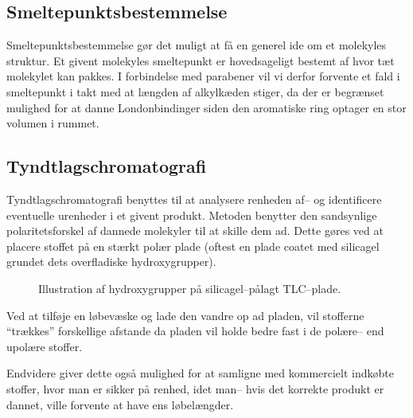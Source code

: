     \subsection{Smeltepunktsbestemmelse}
    Smeltepunktsbestemmelse gør det muligt at få en generel ide om et molekyles struktur. Et givent molekyles smeltepunkt er hovedsageligt bestemt af hvor tæt molekylet kan pakkes. I forbindelse med parabener vil vi derfor forvente et fald i smeltepunkt i takt med at længden af alkylkæden stiger, da der er begrænset mulighed for at danne Londonbindinger siden den aromatiske ring optager en stor volumen i rummet.

    \subsection{Tyndtlagschromatografi}
    Tyndtlagschromatografi benyttes til at analysere renheden af-- og identificere eventuelle urenheder i et givent produkt. Metoden benytter den sandsynlige polaritetsforskel af dannede molekyler til at skille dem ad. Dette gøres ved at placere stoffet på en stærkt polær plade (oftest en plade coatet med silicagel grundet dets overfladiske hydroxygrupper). 
    \begin{figure}[H]
        \caption{Illustration af hydroxygrupper på silicagel--pålagt TLC--plade.}
    \end{figure}
    Ved at tilføje en løbevæske og lade den vandre op ad pladen, vil stofferne ``trækkes'' forskellige afstande da pladen vil holde bedre fast i de polære-- end upolære stoffer.

    Endvidere giver dette også mulighed for at samligne med kommercielt indkøbte stoffer, hvor man er sikker på renhed, idet man-- hvis det korrekte produkt er dannet, ville forvente at have ens løbelængder.
    
